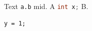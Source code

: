 \documentclass{article}
\begin{document}
Text \lstinline|a.b| mid. A \lstinline[language=C]|int x;| B.
\begin{lstlisting}
y = 1;
\end{lstlisting}
\end{document}
